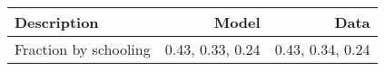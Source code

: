 \begin{tabular}{lrr}
\hline
Description & Model  & Data  \\
\hline
Fraction by schooling & 0.43, 0.33, 0.24  & 0.43, 0.34, 0.24  \\
\hline
\end{tabular}%
